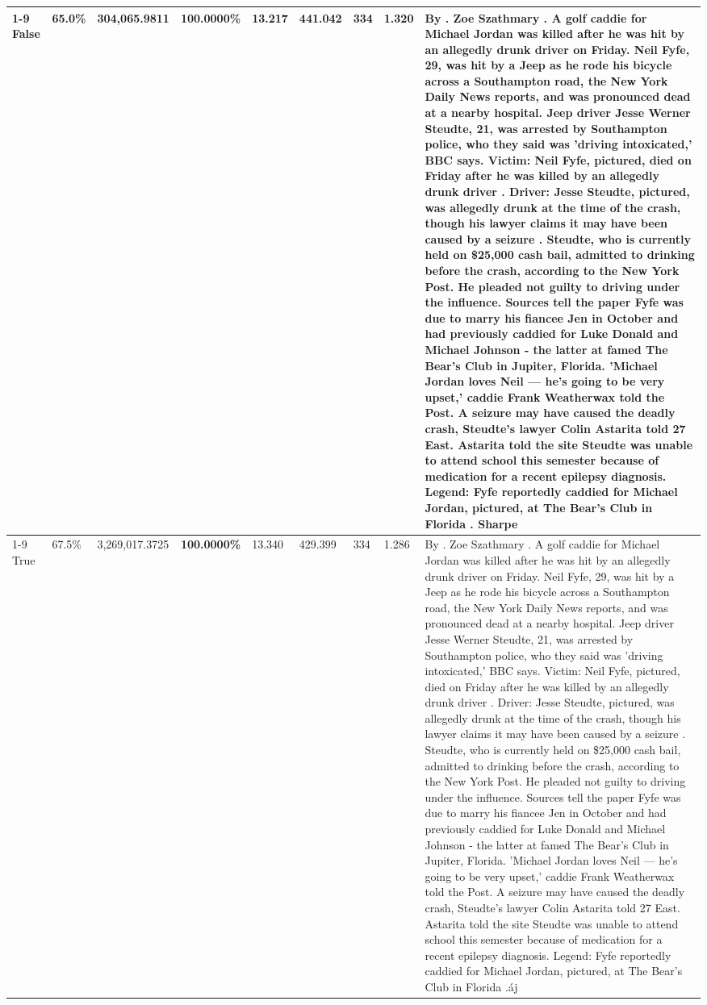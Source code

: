 \begin{table}[H]
\begin{tabular}{lllrlllll}
\cline{1-9}
False & 65.0\% & 304,065.9811 & \bfseries \color{red} 100.0000\% & 13.217 & 441.042 & 334 & 1.320 & By . Zoe Szathmary . A golf caddie for Michael Jordan was killed after he was hit by an allegedly drunk driver on Friday. Neil Fyfe, 29, was hit by a Jeep as he rode his bicycle across a Southampton road, the New York Daily News reports, and was pronounced dead at a nearby hospital. Jeep driver Jesse Werner Steudte, 21, was arrested by Southampton police, who they said was 'driving intoxicated,' BBC says. Victim: Neil Fyfe, pictured, died on Friday after he was killed by an allegedly drunk driver . Driver: Jesse Steudte, pictured, was allegedly drunk at the time of the crash, though his lawyer claims it may have been caused by a seizure . Steudte, who is currently held on \$25,000 cash bail, admitted to drinking before the crash, according to the New York Post. He pleaded not guilty to driving under the influence. Sources tell the paper Fyfe was due to marry his fiancee Jen in October and had previously caddied for Luke Donald and Michael Johnson - the latter at famed The Bear's Club in Jupiter, Florida. 'Michael Jordan loves Neil — he’s going to be very upset,' caddie Frank Weatherwax told the Post. A seizure may have caused the deadly crash, Steudte's lawyer Colin Astarita told 27 East. Astarita told the site Steudte was unable to attend school this semester because of medication for a recent epilepsy diagnosis. Legend: Fyfe reportedly caddied for Michael Jordan, pictured, at The Bear's Club in Florida . Sharpe \\
\cline{1-9}
True & 67.5\% & 3,269,017.3725 & \bfseries \color{red} 100.0000\% & 13.340 & 429.399 & 334 & 1.286 & By . Zoe Szathmary . A golf caddie for Michael Jordan was killed after he was hit by an allegedly drunk driver on Friday. Neil Fyfe, 29, was hit by a Jeep as he rode his bicycle across a Southampton road, the New York Daily News reports, and was pronounced dead at a nearby hospital. Jeep driver Jesse Werner Steudte, 21, was arrested by Southampton police, who they said was 'driving intoxicated,' BBC says. Victim: Neil Fyfe, pictured, died on Friday after he was killed by an allegedly drunk driver . Driver: Jesse Steudte, pictured, was allegedly drunk at the time of the crash, though his lawyer claims it may have been caused by a seizure . Steudte, who is currently held on \$25,000 cash bail, admitted to drinking before the crash, according to the New York Post. He pleaded not guilty to driving under the influence. Sources tell the paper Fyfe was due to marry his fiancee Jen in October and had previously caddied for Luke Donald and Michael Johnson - the latter at famed The Bear's Club in Jupiter, Florida. 'Michael Jordan loves Neil — he’s going to be very upset,' caddie Frank Weatherwax told the Post. A seizure may have caused the deadly crash, Steudte's lawyer Colin Astarita told 27 East. Astarita told the site Steudte was unable to attend school this semester because of medication for a recent epilepsy diagnosis. Legend: Fyfe reportedly caddied for Michael Jordan, pictured, at The Bear's Club in Florida .áj \\

\end{tabular}
\end{table}
